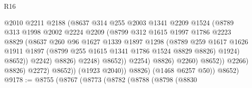 \begin{lexlean}{R16}
\begin{coremodule}
                                      @2010
                                      @2211
                                      @2188
                                      (@8637
                                        @314
                                        @255
                                        @2003
                                        @1341
                                        @2209
                                        @1524
                                        (@8789
                                          @313
                                          @1998
                                          @2002
                                          @2224
                                          @2209
                                          (@8799
                                            @312
                                            @1615
                                            @1997
                                            @1786
                                            @2223
                                            @8829
                                            (@8637
                                              @260
                                              @96
                                              @1627
                                              @1339
                                              @1897
                                              @1298
                                              (@8789
                                                @259
                                                @1617
                                                @1626
                                                @1911
                                                @1897
                                                (@8799 @255 @1615 @1341 @1786 @1524 @8829 @8826)
                                                @1924)
                                              @8652))
                                          @2242)
                                        @8826)
                                      @2248)
                                    @8652))
                                @2254)
                              @8826)
                            @2260)
                          @8652))
                      @2266)
                    @8826)
                  @2272)
                @8652))
            (@1923 @2040))
          @8826)
        (@1468 @6257 @50))
      @8652)
@9178 := @8755
    (@8767
      (@8773
        (@8782
          (@8788
            (@8798
              (@8830

\end{coremodule}
\end{lexlean}
